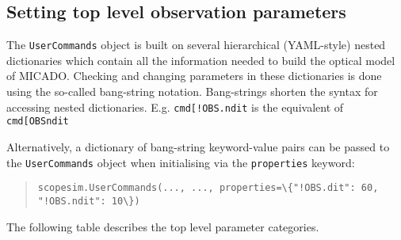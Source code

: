 

\subsection{Setting top level observation parameters%
  \label{setting-top-level-observation-parameters}%
}

The \texttt{UserCommands} object is built on several hierarchical (YAML-style) nested dictionaries which contain all the information needed to build the optical model of MICADO.
Checking and changing parameters in these dictionaries is done using the so-called \textquotedbl{}bang-string\textquotedbl{} notation.
Bang-strings shorten the syntax for accessing nested dictionaries.
E.g. \texttt{cmd{[}\textquotedbl{}!OBS.ndit\textquotedbl{}{]}} is the equivalent of \texttt{cmd{[}\textquotedbl{}OBS\textquotedbl{}{]}{[}\textquotedbl{}ndit\textquotedbl{}{]}}

Alternatively, a dictionary of bang-string keyword-value pairs can be passed to the \texttt{UserCommands} object when initialising via the \texttt{properties} keyword:

\begin{quote}
\begin{alltt}
\begin{lstlisting}[frame=single]
scopesim.UserCommands(..., ..., properties=\{"!OBS.dit": 60, "!OBS.ndit": 10\})
\end{lstlisting}
\end{alltt}
\end{quote}

The following table describes the top level parameter categories.

